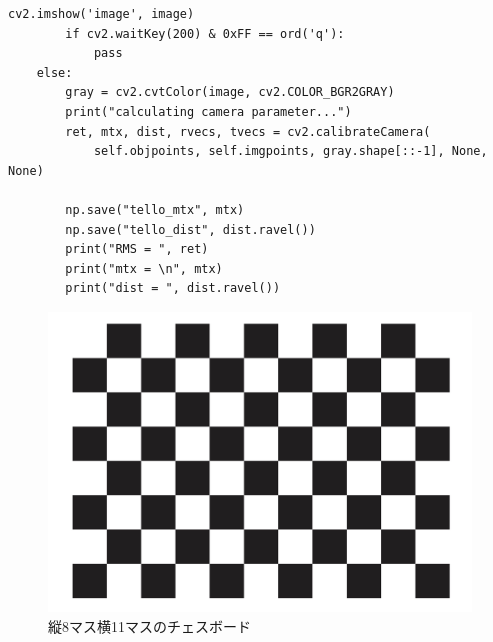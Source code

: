 \begin{lstlisting}[caption=calibration code,label=calib_code]
        cv2.imshow('image', image)                                                                                                                           
        if cv2.waitKey(200) & 0xFF == ord('q'):                                                                                                              
            pass                                                                                                                                             
    else:                                                                                                                                                    
        gray = cv2.cvtColor(image, cv2.COLOR_BGR2GRAY)                                                                                                       
        print("calculating camera parameter...")                                                                                                             
        ret, mtx, dist, rvecs, tvecs = cv2.calibrateCamera(                                                                                                  
            self.objpoints, self.imgpoints, gray.shape[::-1], None, None)                                                                                    
                                                                                                                                                            
        np.save("tello_mtx", mtx)                                                                                                                            
        np.save("tello_dist", dist.ravel())                                                                                                                  
        print("RMS = ", ret)                                                                                                                                 
        print("mtx = \n", mtx)                                                                                                                               
        print("dist = ", dist.ravel())                                                                                                                       
\end{lstlisting}

\begin{figure}[htbp]
  \begin{center}
    \includegraphics[clip,width=15.0cm]{img/chessboard.jpg}
    \caption{縦8マス横11マスのチェスボード}
    \label{chessboard}
  \end{center}
\end{figure}